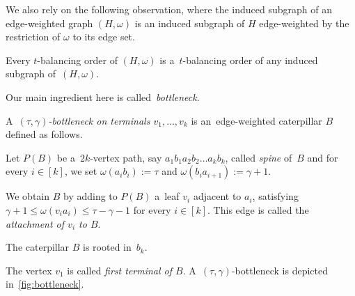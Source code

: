 \documentclass[a4paper,UKenglish,cleveref,hyperref,autoref]{lipics-v2021}
\newcommand{\weight}{\omega}
\begin{document}
We also rely on the following observation, where the induced subgraph of an edge-weighted graph $(H,\weight)$ is an induced subgraph of $H$ edge-weighted by the restriction of $\weight$ to its edge set.
\begin{observation}\label{obs:bo-ind-sub}
  Every $t$-balancing order of $(H,\weight)$ is a~$t$-balancing order of any induced subgraph of~$(H,\weight)$. 
\end{observation}

Our main ingredient here is called~\emph{bottleneck}.


\begin{definition}\label{def:bottleneck}
  A~\emph{$(\tau, \gamma)$-bottleneck on terminals $v_1, \ldots, v_k$} is an~edge-weighted caterpillar $B$ defined as follows.
\begin{compactenum}
\item Let $P(B)$ be a~$2k$-vertex path, say $a_1b_1a_2b_2 \dots a_kb_k$, called \emph{spine} of~$B$ and for every $i \in [k]$, we set $\weight(a_ib_i) := \tau$ and $\weight(b_ia_{i+1}) := \gamma + 1$.
\item We obtain $B$ by adding to $P(B)$ a~leaf $v_i$ adjacent to $a_i$, satisfying $\gamma + 1 \leqslant \weight(v_ia_i) \leqslant \tau - \gamma - 1$ for every $i \in [k]$.
  This edge is called the \emph{attachment of $v_i$ to $B$}.
  \item The caterpillar $B$ is rooted in~$b_k$.
\end{compactenum}
\end{definition}

The vertex $v_1$ is called \emph{first terminal of $B$}.
A~$(\tau, \gamma)$-bottleneck is depicted in~\cref{fig:bottleneck}.
\end{document}
